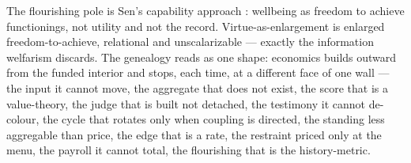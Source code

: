 \begin{econ}[label={e:capability},title={The flourishing pole},ref={op:vmoral},cites={a:sencapability},departs={annex},stopsat={capability is wellbeing as freedom-to-achieve, a state; virtue-as-enlargement is the rate that moves it, the information welfarism discards}]The flourishing pole is Sen's capability approach \parencite{a:sencapability}: wellbeing as freedom to achieve functionings, not utility and not the record. Virtue-as-enlargement is enlarged freedom-to-achieve, relational and unscalarizable --- exactly the information welfarism discards. The genealogy reads as one shape: economics builds outward from the funded interior and stops, each time, at a different face of one wall --- the input it cannot move, the aggregate that does not exist, the score that is a value-theory, the judge that is built not detached, the testimony it cannot de-colour, the cycle that rotates only when coupling is directed, the standing less aggregable than price, the edge that is a rate, the restraint priced only at the menu, the payroll it cannot total, the flourishing that is the history-metric.\end{econ}
